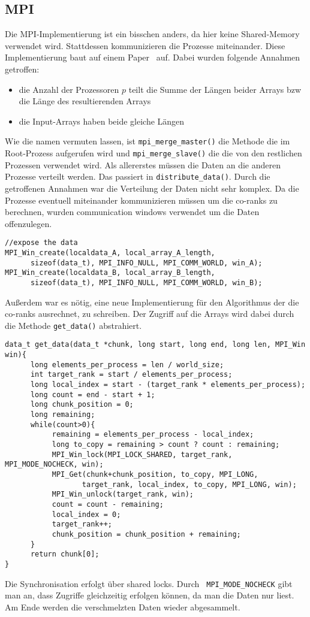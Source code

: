 \subsection{MPI}
Die MPI-Implementierung ist ein bisschen anders, da hier keine Shared-Memory verwendet wird. Stattdessen kommunizieren die Prozesse miteinander. Diese Implementierung baut auf einem Paper~\cite{mpi} auf. Dabei wurden folgende Annahmen getroffen:
\begin{itemize}
\item die Anzahl der Prozessoren $p$ teilt die Summe der Längen beider Arrays bzw die Länge des resultierenden Arrays
\item die Input-Arrays haben beide gleiche Längen
\end{itemize}
Wie die namen vermuten lassen, ist \verb|mpi_merge_master()| die Methode die im Root-Prozess aufgerufen wird und \verb|mpi_merge_slave()| die die von den restlichen Prozessen verwendet wird. Als allererstes müssen die Daten an die anderen Prozesse verteilt werden. Das passiert in \verb|distribute_data()|. Durch die getroffenen Annahmen war die Verteilung der Daten nicht sehr komplex. Da die Prozesse eventuell miteinander kommunizieren müssen um die co-ranks zu berechnen, wurden communication windows verwendet um die Daten offenzulegen.
\begin{verbatim}
//expose the data
MPI_Win_create(localdata_A, local_array_A_length, 
      sizeof(data_t), MPI_INFO_NULL, MPI_COMM_WORLD, win_A);
MPI_Win_create(localdata_B, local_array_B_length, 
      sizeof(data_t), MPI_INFO_NULL, MPI_COMM_WORLD, win_B);
\end{verbatim}
Außerdem war es nötig, eine neue Implementierung für den Algorithmus der die co-ranks ausrechnet, zu schreiben. Der Zugriff auf die Arrays wird dabei durch die Methode \verb|get_data()| abstrahiert. 
\begin{verbatim}
data_t get_data(data_t *chunk, long start, long end, long len, MPI_Win win){
      long elements_per_process = len / world_size;
      int target_rank = start / elements_per_process;
      long local_index = start - (target_rank * elements_per_process);
      long count = end - start + 1;
      long chunk_position = 0;
      long remaining;
      while(count>0){
           remaining = elements_per_process - local_index;
           long to_copy = remaining > count ? count : remaining;
           MPI_Win_lock(MPI_LOCK_SHARED, target_rank, MPI_MODE_NOCHECK, win);
           MPI_Get(chunk+chunk_position, to_copy, MPI_LONG, 
                  target_rank, local_index, to_copy, MPI_LONG, win);
           MPI_Win_unlock(target_rank, win);
           count = count - remaining;
           local_index = 0;
           target_rank++;
           chunk_position = chunk_position + remaining;
      }
      return chunk[0];
}
\end{verbatim}
Die Synchronisation erfolgt über shared locks. Durch \verb| MPI_MODE_NOCHECK| gibt man an, dass Zugriffe gleichzeitig erfolgen können, da man die Daten nur liest. Am Ende werden die verschmelzten Daten wieder abgesammelt.